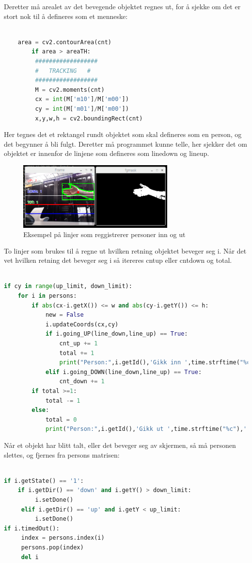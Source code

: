 \documentclass{article}
\begin{document}
Deretter må arealet av det bevegende objektet regnes ut, for å sjekke om det er stort nok til å defineres som et menneske:
\begin{lstlisting}[language=Python, caption=OpenCV 5]

	area = cv2.contourArea(cnt)
    	if area > areaTH:
   		 ##################
   		 #   TRACKING	#
   		 ##################
   		 M = cv2.moments(cnt)
   		 cx = int(M['m10']/M['m00'])
   		 cy = int(M['m01']/M['m00'])
   		 x,y,w,h = cv2.boundingRect(cnt)
\end{lstlisting}

Her tegnes det et rektangel rundt objektet som skal defineres som en person, og det begynner å bli fulgt. Deretter må programmet kunne telle, her sjekker det om objektet er innenfor de linjene som defineres som line\textunderscore down og line\textunderscore up. 

\begin{figure}[!ht]
  \centering
      \includegraphics[width=0.7\textwidth]{fgmask2}
  \caption{Eksempel på linjer som reggistrerer personer inn og ut}
\end{figure}

To linjer som brukes til å regne ut hvilken retning objektet beveger seg i. Når det vet hvilken retning det beveger seg i så itereres cnt\textunderscore up eller cnt\textunderscore down og total. 
\begin{lstlisting}[language=Python, caption=OpenCV 6]

if cy in range(up_limit, down_limit):
	for i in persons:
		if abs(cx-i.getX()) <= w and abs(cy-i.getY()) <= h:
			new = False
			i.updateCoords(cx,cy)
			if i.going_UP(line_down,line_up) == True:
				cnt_up += 1
				total += 1
				print("Person:",i.getId(),'Gikk inn ',time.strftime("%c"),' Total:', str(total))
			elif i.going_DOWN(line_down,line_up) == True:
				cnt_down += 1
		if total >=1:
			total -= 1
		else:
			total = 0
			print("Person:",i.getId(),'Gikk ut ',time.strftime("%c"),' Total:', str(total))	
\end{lstlisting}

Når et objekt har blitt talt, eller det beveger seg av skjermen, så må personen slettes, og fjernes fra persons matrisen:
\begin{lstlisting}[language=Python, caption=OpenCV 6]

if i.getState() == '1':
   	if i.getDir() == 'down' and i.getY() > down_limit:
   		 i.setDone()
   	 elif i.getDir() == 'up' and i.getY < up_limit:
   		 i.setDone()
if i.timedOut():
   	 index = persons.index(i)
   	 persons.pop(index)
   	 del i
\end{lstlisting}
\end{document}

